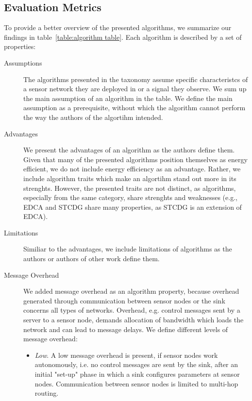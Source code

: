 \subsection{Evaluation Metrics}
\label{sec:Evaluation Metrics}

To provide a better overview of the presented algorithms, we summarize our
findings in table~\ref{table:algorithm table}. Each algorithm is described by a
set of properties:

\begin{description}
    \item[Assumptions]
        The algorithms presented in the taxonomy assume specific characteristcs
        of a sensor network they are deployed in or a signal they observe. We
        sum up the main assumption of an algorithm in the table. We define the
        main assumption as a prerequisite, without which the algorithm cannot
        perform the way the authors of the algortihm intended.
    \item[Advantages]
        We present the advantages of an algorithm as the authors define them.
        Given that many of the presented algorithms position themselves as
        energy efficient, we do not include energy efficiency as an advantage.
        Rather, we include algorithm traits which make an algortihm stand out
        more in its strenghts. However, the presented traits are not distinct,
        as algorithms, especially from the same category, share strenghts and
        weaknesses (e.g., \ac{EDCA} and \ac{STCDG} share many properties, as
        \ac{STCDG} is an extension of \ac{EDCA}).
    \item[Limitations]
        Similiar to the advantages, we include limitations of algorithms as the
        authors or authors of other work define them. 
    \item[Message Overhead]
        We added message overhead as an algorithm property, because overhead
        generated through communication between sensor nodes or the sink
        concerns all types of networks. Overhead, e.g. control messages sent by
        a server to a sensor node, demands allocation of bandwidth which loads
        the network and can lead to message delays. We define different levels
        of message overhead:

        \begin{itemize}
            \item \textit{Low}. A low message overhead is present, if sensor
            nodes work autonomously, i.e. no control messages are sent by the
            sink, after an initial "set-up" phase in which a sink configures
            parameters at sensor nodes. Communication between sensor nodes is
            limited to multi-hop routing.


\end{itemize}
\end{description}
